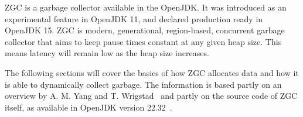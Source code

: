 
ZGC is a garbage collector available in the OpenJDK. It was introduced as an experimental feature in OpenJDK 11, and declared production ready in OpenJDK 15. ZGC is modern, generational, region-based, concurrent garbage collector that aims to keep pause times constant at any given heap size. This means latency will remain low as the heap size increases.

The following sections will cover the basics of how ZGC allocates data and how it is able to dynamically collect garbage. The information is based partly on an overview by A. M. Yang and T. Wrigstad~\cite{zgc_deep_dive} and partly on the source code of ZGC itself, as available in OpenJDK version 22.32~\cite{jdk:tag2232}.

